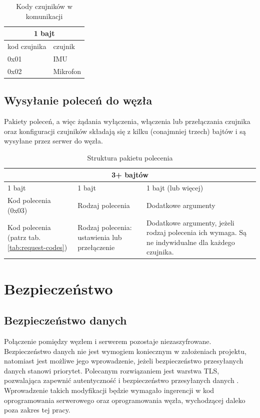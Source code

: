 \documentclass[12pt,oneside,a4paper]{book}
\theoremstyle{break}
\begin{document}
\begin{table}[H]
    \centering
    \begin{tabularx}{\textwidth}{| X | X |}
    \hline
    \multicolumn{2}{|c|}{1 bajt}\\
    \hline
    kod czujnika
    & czujnik\\
    \hline
    0x01
    & IMU\\
    \hline
    0x02
    & Mikrofon\\
    \hline
    \end{tabularx}
    \caption{Kody czujników w komunikacji}
    \label{tab:command-sensor}
\end{table}

\subsection{Wysyłanie poleceń do węzła}
Pakiety poleceń, a więc żądania wyłączenia, włączenia lub przełączania
czujnika oraz konfiguracji czujników składają się z kilku (conajmniej trzech)
bajtów i są wysyłane przez serwer do węzła. 

\begin{table}[H]
    \centering
    \begin{tabularx}{\textwidth}{| X | X | X |}
    \hline
    \multicolumn{3}{|c|}{3+ bajtów}\\
    \hline
    1 bajt 
    & 1 bajt
    & 1 bajt (lub więcej) \\
    \hline
    Kod polecenia (0x03) 
    & Rodzaj polecenia 
    & Dodatkowe argumenty \\
    \hline
    Kod polecenia (patrz tab. \ref{tab:request-codes}) 
    & Rodzaj polecenia: ustawienia lub przełączenie 
    & Dodatkowe argumenty, jeżeli rodzaj polecenia ich wymaga. Są ne indywidualne dla każdego czujnika. \\
    \hline
    \end{tabularx}
    \caption{Struktura pakietu polecenia}
    \label{tab:command-structure}
\end{table}

\section{Bezpieczeństwo}
\subsection{Bezpieczeństwo danych}
Połączenie pomiędzy węzłem i serwerem pozostaje niezaszyfrowane. 
Bezpieczeństwo danych nie jest wymogiem koniecznym w założeniach
projektu, natomiast jest możliwe jego wprowadzenie, jeżeli bezpieczeństwo
przesyłanych danych stanowi priorytet. Polecanym rozwiązaniem jest 
warstwa TLS, pozwalająca zapewnić autentyczność i bezpieczeństwo 
przesyłanych danych \cite{networking} \cite{khan-tls}. Wprowadzenie
takich modyfikacji będzie wymagało ingerencji w kod oprogramowania serwerowego
oraz oprogramowania węzła, wychodzącej daleko poza zakres tej pracy.
\end{document}
